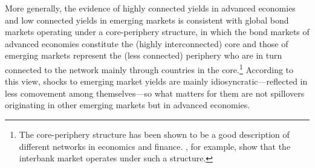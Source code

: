 More generally, the evidence of highly connected yields in advanced economies and low connected yields in emerging markets %
is consistent with %
global bond markets operating under a core-periphery structure, in which the bond markets of advanced economies constitute the (highly interconnected) core and those of emerging markets represent the (less connected) periphery who are in turn connected to the network mainly through countries in the core.\footnote{ The core-periphery structure has been shown to be a good description of different networks in economics and finance. \cite{CvP:2014}, for example, show that the interbank market operates under such a structure.}
According to this view, shocks to emerging market yields are mainly idiosyncratic---reflected in less comovement among themselves---so
what matters for them %
are not spillovers originating in other emerging markets but in advanced economies.

